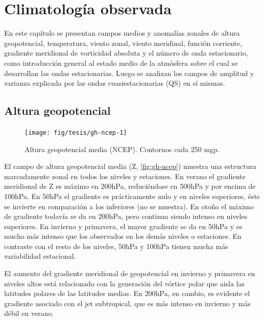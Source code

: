 \documentclass[spanish,a4paper,12pt,oneside]{book}
\begin{document}
\chapter{Climatología observada}\label{climatologia-observada}

En este capítulo se presentan campos medios y anomalías zonales de
altura geopotencial, temperatura, viento zonal, viento meridinal,
función corriente, gradiente meridional de vorticidad absoluta y el
número de onda estacionario, como introducción general al estado medio
de la atmósfera sobre el cual se desarrollan las ondas estacionarias.
Luego se analizan los campos de amplitud y varianza explicada por las
ondas cuasiestacionarias (QS) en sí mismas.

\section{Altura geopotencial}\label{altura-geopotencial}

\begin{landscape}\begin{figure}

{\centering \texttt{[image: fig/tesis/gh-ncep-1]} 

}

\caption{Altura geopotencial media (NCEP). Contornos cada 250 mgp.}\label{fig:gh-ncep}
\end{figure}
\end{landscape}

El campo de altura geopotencial media (Z, \autoref{fig:gh-ncep}) muestra
una estructura marcadamente zonal en todos los niveles y estaciones. En
verano el gradiente meridional de Z es máximo en 200hPa, reduciéndose en
500hPa y por encima de 100hPa. En 50hPa el gradiente es prácticamente
nulo y en niveles superiores, éste se invierte en comparación a los
inferiores (no se muestra). En otoño el máximo de gradiente todavía se
da en 200hPa, pero continua siendo intenso en niveles superiores. En
invierno y primavera, el mayor gradiente se da en 50hPa y es mucho más
intenso que los observados en los demás niveles o estaciones. En
contraste con el resto de los niveles, 50hPa y 100hPa tienen mucha más
variabilidad estacional.

El aumento del gradiente meridional de geopotencial en invierno y
primavera en niveles altos está relacionado con la generación del
vórtice polar que aisla las latitudes polares de las latitudes medias.
En 200hPa, en cambio, es evidente el gradiente asociado con el jet
subtropical, que es más intenso en invierno y más débil en verano.
\end{document}
